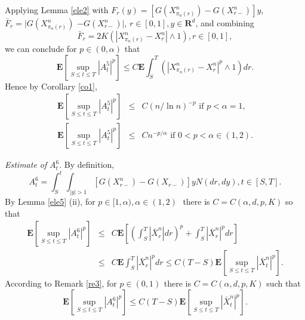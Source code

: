 \documentclass[11pt]{amsart}
\theoremstyle{plain}
\numberwithin{equation}{section}
\begin{document}
Applying Lemma \ref{ele2} with $F_r\left(y\right) =[G\left( X_{\pi
_{n}\left( r\right) }^{n}\right) -G\left( X_{r-}^{n}\right) ]y$, $\bar{F}_{r}=\big\vert G\left( X_{\pi_{n}\left( r\right) }^{n}\right)$ $-G\left(
X_{r-}^{n}\right) \big\vert$, $r\in \left[ 0,1\right] ,y\in \mathbf{R}^{d}$,
and combining 
\begin{equation*}
\bar{F}_{r}=2K\left( \left\vert X_{\pi _{n}\left( r\right)
}^{n}-X_{r}^{n}\right\vert \wedge 1\right) ,r\in \left[ 0,1\right] ,
\end{equation*}
we can conclude for $p\in \left( 0,\alpha \right) $ that 
\begin{equation*}
\mathbf{E}\left[ \sup_{S\leq t\leq T}\left\vert A_{t}^{5}\right\vert ^{p}\right] \leq C\mathbf{E}\int_{S}^{T}(\left\vert X_{\pi _{n}\left( r\right)
}^{n}-X_{r}^{n}\right\vert ^{p}\wedge 1)dr.
\end{equation*}Hence by Corollary \ref{co1},\begin{eqnarray*}
\mathbf{E}\left[ \sup_{S\leq t\leq T}\left\vert A_{t}^{5}\right\vert ^{p}\right] &\leq &C\left( n/\ln n\right) ^{-p}\text{ if }p<\alpha =1, \\
\mathbf{E}\left[ \sup_{S\leq t\leq T}\left\vert A_{t}^{5}\right\vert ^{p}\right] &\leq &Cn^{-p/\alpha }\text{ if }0<p<\alpha \in \left( 1,2\right) .
\end{eqnarray*}

\emph{Estimate of }$A_t^{6}.$ By definition, 
\begin{equation*}
A_{t}^{6}=\int_{S}^{t}\int_{\left\vert y\right\vert >1}\left[ G\left(
X_{r-}^{n}\right) -G\left( X_{r-}\right) \right] yN\left( dr,dy\right) ,t\in \left[ S,T\right] .
\end{equation*}By Lemma \ref{ele5} (ii), for $p\in \lbrack 1,\alpha ),\alpha \in \left(
1,2\right) \,$\ there is $C=C\left( \alpha,d ,p,K\right) $ so that\begin{eqnarray*}
\mathbf{E}\left[ \sup_{S\leq t\leq T}\left\vert A_{t}^{6}\right\vert ^{p}\right] &\leq &C\mathbf{E}\left[ \left( \int_{S}^{T}\left\vert \bar{X}_{r}^{n}\right\vert dr\right) ^{p}+\int_{S}^{T}\left\vert \bar{X}_{r}^{n}\right\vert ^{p}dr\right] \\
&\leq &C\mathbf{E}\int_{S}^{T}\left\vert \bar{X}_{r}^{n}\right\vert
^{p}dr\leq C\left( T-S\right) \mathbf{E}\left[ \sup_{S\leq t\leq
T}\left\vert \bar{X}_{t}^{n}\right\vert ^{p}\right] .
\end{eqnarray*}According to Remark \ref{re3}, for $p\in \left( 0,1\right) \,\ $there is $C=C\left( \alpha,d ,p,K\right) $ such that\begin{equation*}
\mathbf{E}\left[ \sup_{S\leq t\leq T}\left\vert A_{t}^{6}\right\vert ^{p}\right] \leq C\left( T-S\right) \mathbf{E}\left[ \sup_{S\leq t\leq
T}\left\vert \bar{X}_{t}^{n}\right\vert ^{p}\right] .
\end{equation*}
\end{document}
